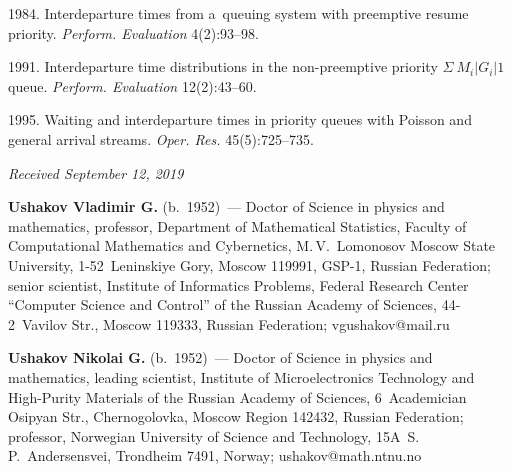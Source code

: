 \vspace*{-6pt}

  \begin{multicols}{2}

\renewcommand{\bibname}{\protect\rmfamily References}

{\small\frenchspacing
 {%
 \begin{thebibliography}{9}

 1984. Interdeparture times from 
a~queuing system with preemptive resume priority. 
\textit{Perform. Evaluation} 4(2):93--98.

 1991. Interdeparture time distributions in the 
non-preemptive priority $\Sigma\ M_i|G_i|1$ queue. 
\textit{Perform. Evaluation} 12(2):43--60.

 1995. Waiting and interdeparture times in priority
 queues with Poisson and general arrival streams. 
 \textit{Oper. Res.} 45(5):725--735.
\end{thebibliography}

 }
 }

\end{multicols}

\vspace*{-7pt}

\hfill{\small\textit{Received September 12, 2019}}



\Contr

\noindent
\textbf{Ushakov Vladimir G.} (b.\ 1952)~--- 
Doctor of Science in physics and mathematics, professor, Department of 
Mathematical Statistics, Faculty of Computational Mathematics and Cybernetics, 
M.\,V.~Lomonosov Moscow State University, 1-52~Leninskiye Gory, 
Moscow 119991, GSP-1, Russian Federation; senior scientist, Institute 
of Informatics Problems, Federal Research Center ``Computer Science 
and Control'' of the Russian Academy of Sciences, 44-2~Vavilov Str., 
Moscow 119333, Russian Federation; \mbox{vgushakov@mail.ru}

\vspace*{6pt}

\noindent
\textbf{Ushakov Nikolai G.} (b.\ 1952)~--- 
Doctor of Science in physics and mathematics, leading scientist, 
Institute of Microelectronics Technology and High-Purity Materials 
of the Russian Academy of Sciences, 6~Academician Osipyan Str., Chernogolovka, 
Moscow Region 142432, Russian Federation; professor, Norwegian University
 of Science and Technology, 15A~S.\,P.~Andersensvei, Trondheim 7491, 
 Norway; \mbox{ushakov@math.ntnu.no}
\label{end\stat}

\renewcommand{\bibname}{\protect\rm Литература}  